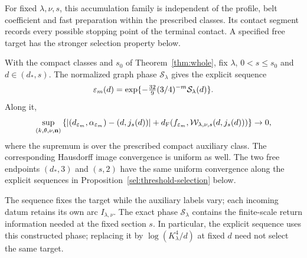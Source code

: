 For fixed $\lambda,\nu,s$, this accumulation family is independent
of the profile, belt coefficient and fast preparation within the
prescribed classes. Its contact segment records every possible
stopping point of the terminal contact. A specified free
target has the stronger selection property below.

\begingroup
\renewcommand{\thetheorem}{B}
\begin{theorem}
\label{thm:common-free}
With the compact classes and $s_0$ of Theorem~\ref{thm:whole}, fix
$\lambda$, $0<s\le s_0$ and $d\in(d_*,s)$. The normalized graph phase
$\mathcal S_\lambda$ gives the explicit sequence
\begin{equation}
 \varepsilon_m(d)=\exp\{-\tfrac{32}{9}(3/4)^{-m}
                                      \mathcal S_\lambda(d)\}.
 \label{eq:ps5-common}
\end{equation}
Along it,
\begin{equation}
 \sup_{(k,\theta,\nu,\mathbf n)}
 \left\{|(d_{\varepsilon_m},\alpha_{\varepsilon_m})-(d,j_s(d))|
 +d_{\mathrm F}(f_{\varepsilon_m},\mathcal W_{\lambda,\nu,s}(d,j_s(d)))\right\}\to0,
 \label{eq:common-target-limit}
\end{equation}
where the supremum is over the prescribed compact auxiliary class.
The corresponding Hausdorff image convergence is uniform as well.
The two free endpoints $(d_*,3)$ and $(s,2)$ have the same
uniform convergence along the explicit sequences in
Proposition~\ref{sel:threshold-selection} below.
\end{theorem}
\endgroup

The sequence fixes the target while the auxiliary labels vary;
each incoming datum retains its own arc $I_{\lambda,\nu}$.
The exact phase $\mathcal S_\lambda$ contains the finite-scale
return information needed at the fixed section $s$.
In particular, the explicit sequence uses this constructed phase;
replacing it by $\log(K_\lambda^4/d)$ at fixed $d$ need not select
the same target.

